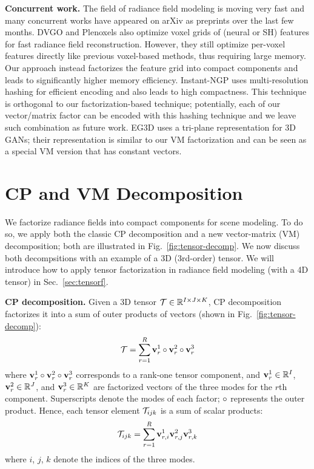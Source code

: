 \documentclass[runningheads]{llncs}
\newcommand{\boldstartspace}[1]{\vspace{0.1in}\noindent\textbf{#1}}
\begin{document}
\boldstartspace{Concurrent work.}
The field of radiance field modeling is moving very fast and many concurrent works have appeared on arXiv as preprints over the last few months. DVGO \cite{sun2021direct} and Plenoxels \cite{yu2021plenoxels} also optimize voxel grids of (neural or SH) features for fast radiance field reconstruction. 
However, they still optimize per-voxel features directly like previous voxel-based methods, thus requiring large memory. Our approach instead factorizes the feature grid into compact components and leads to significantly higher memory efficiency.
Instant-NGP \cite{muller2022instant} uses multi-resolution hashing for efficient encoding and also leads to high compactness. 
This technique is orthogonal to our factorization-based technique; potentially, each of our vector/matrix factor can be encoded with this hashing technique and we leave such combination as future work. 
EG3D \cite{Chan2022EG3D} uses a tri-plane representation for 3D GANs; their representation is similar to our VM factorization and can be seen as a special VM version that has constant vectors. 


%
 




\section{CP and VM Decomposition}
\label{sec:vm-factor}
We factorize radiance fields into compact components for scene modeling.
To do so, we apply both the classic CP decomposition and a new vector-matrix (VM) decomposition; both are illustrated in Fig.~\ref{fig:tensor-decomp}.
We now discuss both decompsitions with an example of a 3D (3rd-order) tensor. We will introduce how to apply tensor factorization in radiance field modeling (with a 4D tensor) in Sec.~\ref{sec:tensorf}.


\boldstartspace{CP decomposition.} 
Given a 3D tensor $\mathcal{T} \in \mathbb{R}^{I\times J\times K}$, CP decomposition factorizes it into a sum of outer products of vectors (shown in Fig.~\ref{fig:tensor-decomp}):
\begin{equation}
    \mathcal{T} = \sum_{r=1}^R \mathbf{v}_r^{1} \circ \mathbf{v}_r^{2} \circ \mathbf{v}_r^{3}
    \label{eqn:cpvector}
\end{equation}
where $\mathbf{v}_r^{1} \circ \mathbf{v}_r^{2} \circ \mathbf{v}_r^{3}$ corresponds to a rank-one tensor component, and $\mathbf{v}_r^{1} \in \mathbb{R}^{I}$, $\mathbf{v}_r^{2} \in \mathbb{R}^{J}$, and $\mathbf{v}_r^{3} \in \mathbb{R}^{K}$ are factorized vectors of the three modes for the $r$th component. Superscripts denote the modes of each factor; $\circ$ represents the outer product. Hence, each tensor element $\mathcal{T}_{ijk}$ is a sum of scalar products:
\begin{equation}
    \mathcal{T}_{ijk} = \sum_{r=1}^R \mathbf{v}_{r,i}^{1} \mathbf{v}_{r,j}^{2} \mathbf{v}_{r,k}^{3}
    \label{eqn:cpelement}
\end{equation}
where $i$, $j$, $k$ denote the indices of the three modes. 
\end{document}
